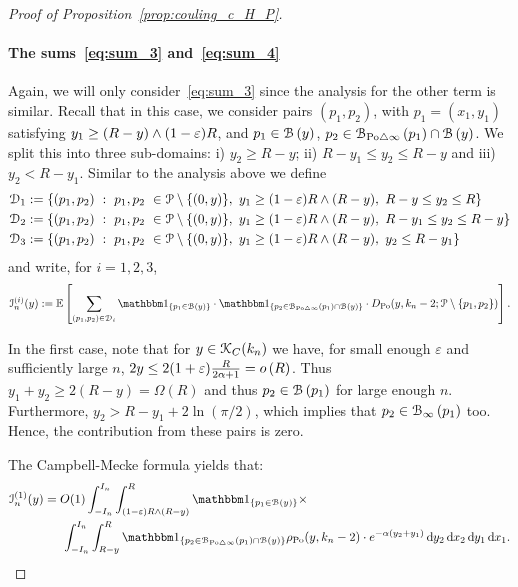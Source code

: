 \begin{proof}[Proof of Proposition~\ref{prop:couling_c_H_P}]
\paragraph{The sums~\eqref{eq:sum_3} and~\eqref{eq:sum_4}}
Again, we will only consider~\eqref{eq:sum_3} since the analysis for the other term is similar. Recall that in this case, we consider pairs $(p_1,p_2)$, with $p_1 = (x_1,y_1)$ satisfying 
$y_1 \geq (R - y) \wedge (1-\varepsilon)R$, and $p_1 \in {\mathcal B}\left(y\right)$, $p_2 \in {\mathcal B}_{{\mathrm{Po}} \bigtriangleup \infty}\left(p_1\right) \cap {\mathcal B}\left(y\right)$. 
We split this into three sub-domains:  i) $y_2 \geq R - y$; ii) $R -y_1 \leq y_2 \leq R -y$ and iii) $y_2 < R - y_1$. Similar to the analysis above we define
\begin{align*}
	\mathcal{D}_{1} &:= \{(p_1, p_2) \ : \  p_1,p_2 \ \in {\mathcal P} \setminus \{(0,y) \}, \ y_1 \geq (1-\varepsilon) R \wedge (R-y), 
		\ R -y \leq y_2 \leq R \}\\
	\mathcal{D}_{2} &:= \{(p_1, p_2) \ : \  p_1,p_2 \ \in {\mathcal P} \setminus \{(0,y) \}, \ y_1 \geq (1-\varepsilon) R \wedge (R-y), 
		\ R -y_1 \leq y_2 \leq R - y \}\\
	\mathcal{D}_{3} &:= \{(p_1, p_2) \ : \  p_1,p_2 \ \in {\mathcal P} \setminus \{(0,y) \}, \ y_1 \geq (1-\varepsilon) R \wedge (R-y), 
		\ y_2 \leq R - y_1 \}
\end{align*}
and write, for $i = 1,2,3$,
\[
	\mathcal{I}_n^{(i)}(y) := \Exp { \sum_{(p_1,p_2)  \in \dom{i}} 
	\ind{p_1 \in \BallHyp{y}} \cdot \ind{p_2 \in \BallSym{p_1} \cap \BallHyp{y}}
	\cdot D_{\Po} (y,k_n-2;\Pcal \setminus \{ p_1, p_2\})}.
\]


In the first case, note that for $y \in {\mathcal K}_{C}(k_n)$ we have, for small enough $\varepsilon$ and sufficiently large $n$, $2y \le 2(1+\varepsilon)
\frac{R}{2\alpha +1} = o\left(R\right)$. Thus $y_1 + y_2 \geq 2(R - y) = \Omega(R)$ and thus $p_2 \in {\mathcal B}\left(p_1\right)$ for large enough $n$. Furthermore, 
$y_2 > R - y_1 + 2\ln (\pi/2)$, which implies that $p_2 \in {\mathcal B}_{\infty}\left(p_1\right)$ too. 
Hence, the contribution from these pairs is zero.   

The Campbell-Mecke formula yields that: 
\begin{equation*}
\begin{split} 
\mathcal{I}_n^{(1)}(y) 
&=O(1) \int_{-I_n}^{I_n} \int_{(1-\eps) R \wedge (R-y)}^{R} \ind{p_1 \in \BallHyp{y}} \times\\
& \hspace{15pt}\int_{-I_n}^{I_n} \int_{R - y}^{R} 
\ind{p_2 \in \BallSym{p_1} \cap \BallHyp{y}}
  \rho_{\Po}(y,k_n-2) \cdot
e^{-\alpha( y_2 + y_1)} \dd y_2 \dd x_2 \dd y_1 \dd x_1.
\end{split}
\end{equation*}


\end{proof}
